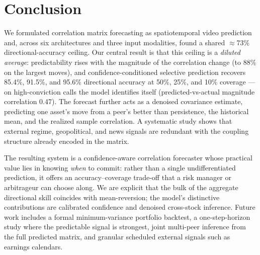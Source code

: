 \documentclass[runningheads]{llncs}
\begin{document}
\section{Conclusion}\label{sec:conclusion}

We formulated correlation matrix forecasting as spatiotemporal video
prediction and, across six architectures and three input modalities,
found a shared $\approx$73\% directional-accuracy ceiling. Our central
result is that this ceiling is a \emph{diluted average}: predictability
rises with the magnitude of the correlation change (to 88\% on the
largest moves), and confidence-conditioned selective prediction recovers
85.4\%, 91.5\%, and 95.6\% directional accuracy at 50\%, 25\%, and 10\%
coverage --- on high-conviction calls the model identifies itself
(predicted-vs-actual magnitude correlation 0.47). The forecast further
acts as a denoised covariance estimate, predicting one asset's move from
a peer's better than persistence, the historical mean, and the realized
sample correlation. A systematic study shows that external regime,
geopolitical, and news signals are redundant with the coupling structure
already encoded in the matrix.

The resulting system is a confidence-aware correlation forecaster whose
practical value lies in knowing \emph{when} to commit: rather than a
single undifferentiated prediction, it offers an accuracy--coverage
trade-off that a risk manager or arbitrageur can choose along. We are
explicit that the bulk of the aggregate directional skill coincides with
mean-reversion; the model's distinctive contributions are calibrated
confidence and denoised cross-stock inference. Future work includes a
formal minimum-variance portfolio backtest, a one-step-horizon study
where the predictable signal is strongest, joint multi-peer inference
from the full predicted matrix, and granular scheduled external signals
such as earnings calendars.
\end{document}
